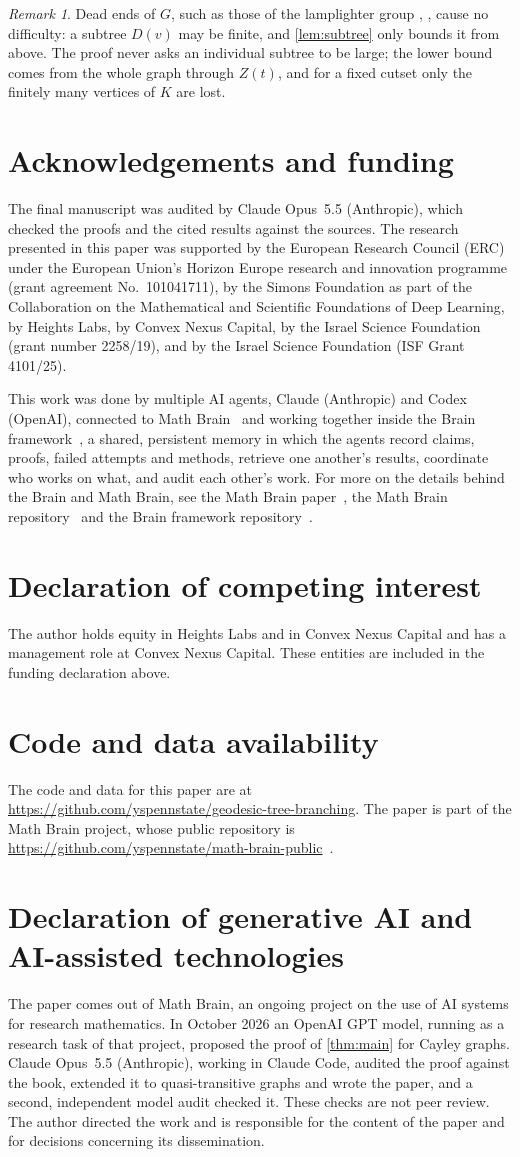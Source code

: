 \documentclass[11pt]{amsart}
\newcommand{\FUNDING}{The research presented in this paper was supported by the European Research Council (ERC) under the European Union's Horizon Europe research and innovation programme (grant agreement No.~101041711), by the Simons Foundation as part of the Collaboration on the Mathematical and Scientific Foundations of Deep Learning, by Heights Labs, by Convex Nexus Capital, by the Israel Science Foundation (grant number 2258/19), and by the Israel Science Foundation (ISF Grant 4101/25).}
\newcommand{\ACKNOWLEDGMENTS}{The final manuscript was audited by Claude Opus~5.5 (Anthropic), which checked the proofs and the cited results against the sources. }
\theoremstyle{remark}
\newtheorem{remark}[theorem]{Remark}
\begin{document}
\begin{remark}
Dead ends of $G$, such as those of the lamplighter group \cite{ClearyTaback}, \cite[Section~3.4]{LP}, cause no difficulty: a subtree $D(v)$ may be finite, and \cref{lem:subtree} only bounds it from above. The proof never asks an individual subtree to be large; the lower bound comes from the whole graph through $Z(t)$, and for a fixed cutset only the finitely many vertices of $K$ are lost.
\end{remark}

\section*{Acknowledgements and funding}
\ACKNOWLEDGMENTS\FUNDING

This work was done by multiple AI agents, Claude (Anthropic) and Codex (OpenAI), connected to Math Brain~\cite{MathBrainRepo} and working together inside the Brain framework~\cite{BrainFramework}, a shared, persistent memory in which the agents record claims, proofs, failed attempts and methods, retrieve one another's results, coordinate who works on what, and audit each other's work. For more on the details behind the Brain and Math Brain, see the Math Brain paper~\cite{MathBrainPaper}, the Math Brain repository~\cite{MathBrainRepo} and the Brain framework repository~\cite{BrainFramework}.

\section*{Declaration of competing interest}
The author holds equity in Heights Labs and in Convex Nexus Capital and has a management role at Convex Nexus Capital. These entities are included in the funding declaration above.

\section*{Code and data availability}
The code and data for this paper are at \url{https://github.com/yspennstate/geodesic-tree-branching}. The paper is part of the Math Brain project, whose public repository is \url{https://github.com/yspennstate/math-brain-public}~\cite{MathBrainRepo}.

\section*{Declaration of generative AI and AI-assisted technologies}
The paper comes out of Math Brain, an ongoing project on the use of AI systems for research mathematics. In October 2026 an OpenAI GPT model, running as a research task of that project, proposed the proof of \cref{thm:main} for Cayley graphs. Claude Opus~5.5 (Anthropic), working in Claude Code, audited the proof against the book, extended it to quasi-transitive graphs and wrote the paper, and a second, independent model audit checked it. These checks are not peer review. The author directed the work and is responsible for the content of the paper and for decisions concerning its dissemination.



\end{document}
